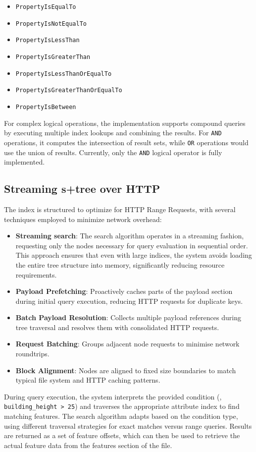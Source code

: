 \begin{itemize}
  \item \texttt{PropertyIsEqualTo}
  \item \texttt{PropertyIsNotEqualTo}
  \item \texttt{PropertyIsLessThan}
  \item \texttt{PropertyIsGreaterThan}
  \item \texttt{PropertyIsLessThanOrEqualTo}
  \item \texttt{PropertyIsGreaterThanOrEqualTo}
  \item \texttt{PropertyIsBetween}
\end{itemize}

For complex logical operations, the implementation supports compound queries by executing multiple index lookups and combining the results. For \texttt{AND} operations, it computes the intersection of result sets, while \texttt{OR} operations would use the union of results. Currently, only the \texttt{AND} logical operator is fully implemented.

\subsection{Streaming \texorpdfstring{\ac{s+tree}}{S+tree} over HTTP}
\label{methodology:attribute_index:streaming_s_tree}

The index is structured to optimize for HTTP Range Requests, with several techniques employed to minimize network overhead:

\begin{itemize}
  \item \textbf{Streaming search}: The search algorithm operates in a streaming fashion, requesting only the nodes necessary for query evaluation in sequential order. This approach ensures that even with large indices, the system avoids loading the entire tree structure into memory, significantly reducing resource requirements.
  \item \textbf{Payload Prefetching}: Proactively caches parts of the payload section during initial query execution, reducing HTTP requests for duplicate keys.
  \item \textbf{Batch Payload Resolution}: Collects multiple payload references during tree traversal and resolves them with consolidated HTTP requests.
  \item \textbf{Request Batching}: Groups adjacent node requests to minimise network roundtrips.
  \item \textbf{Block Alignment}: Nodes are aligned to fixed size boundaries to match typical file system and HTTP caching patterns.
\end{itemize}

During query execution, the system interprets the provided condition (\eg, \texttt{building\_height > 25}) and traverses the appropriate attribute index to find matching features. The search algorithm adapts based on the condition type, using different traversal strategies for exact matches versus range queries. Results are returned as a set of feature offsets, which can then be used to retrieve the actual feature data from the features section of the file.
